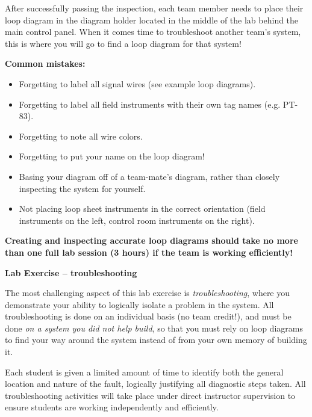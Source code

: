 \documentclass[12pt,a4paper]{article}
\begin{document}
\begin{itemize}
After successfully passing the inspection, each team member needs to place their loop diagram in the diagram holder located in the middle of the lab behind the main control panel.  When it comes time to troubleshoot another team's system, this is where you will go to find a loop diagram for that system!

\vskip 10pt

{\bf Common mistakes:}

\begin{itemize}
\item{} Forgetting to label all signal wires (see example loop diagrams).
\item{} Forgetting to label all field instruments with their own tag names (e.g. PT-83).
\item{} Forgetting to note all wire colors.
\item{} Forgetting to put your name on the loop diagram!
\item{} Basing your diagram off of a team-mate's diagram, rather than closely inspecting the system for yourself.
\item{} Not placing loop sheet instruments in the correct orientation (field instruments on the left, control room instruments on the right).
\end{itemize}

\vskip 10pt

{\bf Creating and inspecting accurate loop diagrams should take no more than one full lab session (3 hours) if the team is working efficiently!}







\vfil \eject

\noindent
{\bf Lab Exercise -- troubleshooting}

\vskip 5pt

The most challenging aspect of this lab exercise is {\it troubleshooting}, where you demonstrate your ability to logically isolate a problem in the system.  All troubleshooting is done on an individual basis (no team credit!), and must be done {\it on a system you did not help build}, so that you must rely on loop diagrams to find your way around the system instead of from your own memory of building it.

Each student is given a limited amount of time to identify both the general location and nature of the fault, logically justifying all diagnostic steps taken.  All troubleshooting activities will take place under direct instructor supervision to ensure students are working independently and efficiently. 


\end{itemize}
\end{document}
